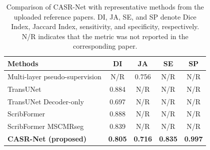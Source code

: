 \begin{table}[t]
\centering
\caption{Comparison of CASR-Net with representative methods from the uploaded reference papers. DI, JA, SE, and SP denote Dice Index, Jaccard Index, sensitivity, and specificity, respectively. N/R indicates that the metric was not reported in the corresponding paper.}
\label{tab:uploaded_paper_methods_comparison}
\begin{tabular}{lcccc}
\hline
Methods & DI & JA & SE & SP \\
\hline
Multi-layer pseudo-supervision & N/R & 0.756 & N/R & N/R \\
TransUNet & 0.884 & N/R & N/R & N/R \\
TransUNet Decoder-only & 0.697 & N/R & N/R & N/R \\
ScribFormer & 0.888 & N/R & N/R & N/R \\
ScribFormer MSCMRseg & 0.839 & N/R & N/R & N/R \\
\textbf{CASR-Net (proposed)} & \textbf{0.805} & \textbf{0.716} & \textbf{0.835} & \textbf{0.997} \\
\hline
\end{tabular}
\end{table}
